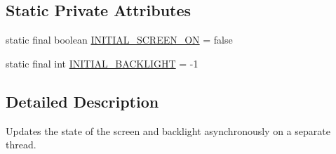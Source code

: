 \subsection*{Static Private Attributes}
\begin{DoxyCompactItemize}
\item 
static final boolean \hyperlink{classcom_1_1android_1_1server_1_1power_1_1DisplayPowerState_1_1PhotonicModulator_aba2a7ba030813ba22a618a61511bfd48}{I\-N\-I\-T\-I\-A\-L\-\_\-\-S\-C\-R\-E\-E\-N\-\_\-\-O\-N} = false
\item 
static final int \hyperlink{classcom_1_1android_1_1server_1_1power_1_1DisplayPowerState_1_1PhotonicModulator_ad07cac64078210d3346fea0041c25cfd}{I\-N\-I\-T\-I\-A\-L\-\_\-\-B\-A\-C\-K\-L\-I\-G\-H\-T} = -\/1
\end{DoxyCompactItemize}


\subsection{Detailed Description}
Updates the state of the screen and backlight asynchronously on a separate thread. 

